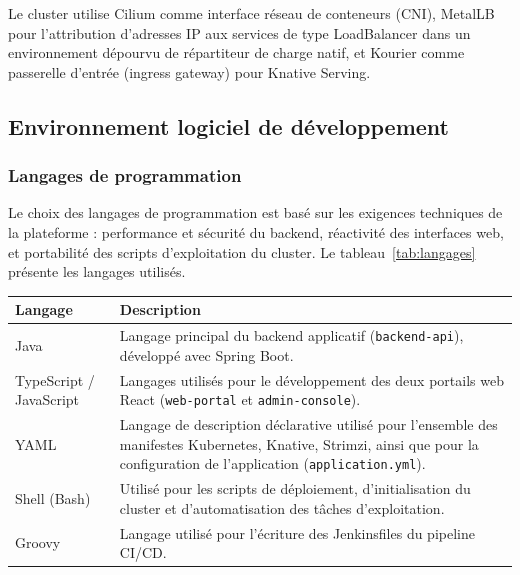 Le cluster utilise Cilium comme interface réseau de conteneurs (CNI), MetalLB pour l'attribution d'adresses IP aux services de type LoadBalancer dans un environnement dépourvu de répartiteur de charge natif, et Kourier comme passerelle d'entrée (ingress gateway) pour Knative Serving.

\subsection{Environnement logiciel de développement}

\subsubsection{Langages de programmation}

Le choix des langages de programmation est basé sur les exigences techniques de la plateforme : performance et sécurité du backend, réactivité des interfaces web, et portabilité des scripts d'exploitation du cluster. Le tableau~\ref{tab:langages} présente les langages utilisés.

\renewcommand{\arraystretch}{1.3}
\begin{center}
\begin{tabular}{|m{3cm}|m{10cm}|}
\hline
\centering Langage & \centering\arraybackslash Description \\
\hline
Java & Langage principal du backend applicatif (\texttt{backend-api}), développé avec Spring Boot. \\
\hline
TypeScript / JavaScript & Langages utilisés pour le développement des deux portails web React (\texttt{web-portal} et \texttt{admin-console}). \\
\hline
YAML & Langage de description déclarative utilisé pour l'ensemble des manifestes Kubernetes, Knative, Strimzi, ainsi que pour la configuration de l'application (\texttt{application.yml}). \\
\hline
Shell (Bash) & Utilisé pour les scripts de déploiement, d'initialisation du cluster et d'automatisation des tâches d'exploitation. \\
\hline
Groovy & Langage utilisé pour l'écriture des Jenkinsfiles du pipeline CI/CD. \\
\hline
\end{tabular}
\label{tab:langages}
\end{center}

\vspace{1em}

